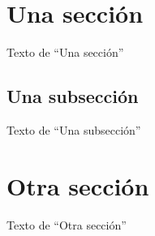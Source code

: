 \documentclass[a4paper,10pt]{article}
\begin{document}
 \section{Una sección}
 Texto de ``Una sección''
 \subsection{Una subsección}
 Texto de ``Una subsección''
 \section{Otra sección}
 Texto de ``Otra sección''
\end{document}
